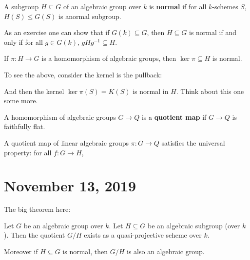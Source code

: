 \documentclass[12pt]{article}
\begin{document}
\begin{defn}
	A subgroup $H\subseteq G$ of an algebraic group over $k$ is \textbf{normal} if for all $k$-schemes $S$, $H(S)\le G(S)$ is anormal subgroup.
\end{defn}
\begin{rmk}
	As an exercise one can show that if $G(k)\subseteq G$, then $H\subseteq G$ is normal if and only if for all $g\in G(k)$, $gHg^{-1}\subseteq H$.
\end{rmk}
\begin{lem}
	If $\pi:H\to G$ is a homomorphism of algebraic groups, then $\ker\pi\subseteq H$ is normal.
\end{lem}
To see the above, consider the kernel is the pullback:
\begin{center}
\end{center}
And then the kernel $\ker \pi(S)=K(S)$ is normal in $H$. Think about this one some more.
\begin{defn}
	A homomorphism of algebraic groups $G\to Q$ is a \textbf{quotient map} if $G\to Q$ is faithfully flat.
\end{defn}
\begin{prop}
	A quotient map of linear algebraic groups $\pi:G\to Q$ satisfies the universal property: for all $f:G\to H$,
	\begin{center}
	\end{center}
\end{prop}

\section{November 13, 2019}
The big theorem here:
\begin{thm}
	Let $G$ be an algebraic group over $k$. Let $H\subseteq G$ be an algebraic subgroup (over $k$). Then the
	quotient $G/H$ exists as a quasi-projective scheme over $k$.

	Moreover if $H\subseteq G$ is normal, then $G/H$ is also an algebraic group.
\end{thm}
\end{document}
